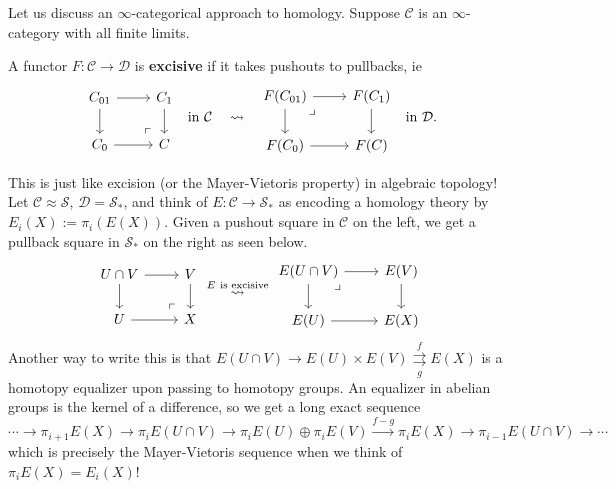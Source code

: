 Let us discuss an $\infty$-categorical approach to homology. Suppose $\mathcal{C} $ is an $\infty$-category with all finite limits.
\begin{definition}[]
    A functor $F \colon \mathcal{C}  \to \mathcal{D} $ is \textbf{excisive} if it takes pushouts to pullbacks, ie  \[
    \begin{tikzcd}
        C_{01}\arrow[r] \arrow[d] & C_1 \arrow[d] \\
        C_0\arrow[r] & C\arrow[ul,phantom,"\ulcorner",very near start]
    \end{tikzcd}\ \ \text{in} \ \mathcal{C}  \quad \leadsto \ \
    \begin{tikzcd}
        F(C_{01})\arrow[r]\arrow[d]\arrow[dr,phantom,"\lrcorner",very near start] & F(C_1)\arrow[d]\\
        F(C_0)\arrow[r]& F(C) 
    \end{tikzcd}\ \ \text{in} \ \mathcal{D}.
\] \end{definition}
This is just like excision (or the Mayer-Vietoris property) in algebraic topology! Let $\mathcal{C}\approx \mathcal{S}  $, $\mathcal{D} =\mathcal{S} _*$, and think of $E \colon \mathcal{C}  \to \mathcal{S} _*$ as encoding a homology theory by $E_i (X):= \pi_i (E(X))$. Given a pushout square in $\mathcal{C} $ on the left, we get a pullback square in $\mathcal{S} _*$ on the right as seen below. \[
    \begin{tikzcd}
        U \cap V\arrow[d]\arrow[r] & V\arrow[d] \\
        U\arrow[r] & X\arrow[ul,phantom,"\ulcorner",very near start]
    \end{tikzcd}  \overset{E \ \text{is excisive} }{\leadsto}   
    \begin{tikzcd}
        E(U \cap V)\arrow[r]\arrow[d]\arrow[dr,phantom,"\lrcorner",very near start] & E(V)\arrow[d]\\
        E(U)\arrow[r]& E(X)
    \end{tikzcd}
\] Another way to write this is that $E(U \cap V) \to  E(U) \times E(V) \underset{g}{\overset{f}{\rightrightarrows} }  E(X)$ is a homotopy equalizer upon passing to homotopy groups. An equalizer in abelian groups is the kernel of a difference, so we get a long exact sequence \[
\cdots \to \pi_{i+1}E(X) \longrightarrow \pi_i E(U\cap V) \longrightarrow \pi_i E(U) \oplus \pi_i E(V) \overset{f-g}{\longrightarrow} \pi_i E(X) \longrightarrow \pi_{i-1}E(U \cap V) \to \cdots 
\] which is precisely the Mayer-Vietoris sequence when we think of $\pi_i E(X)=E_i (X)$! 

